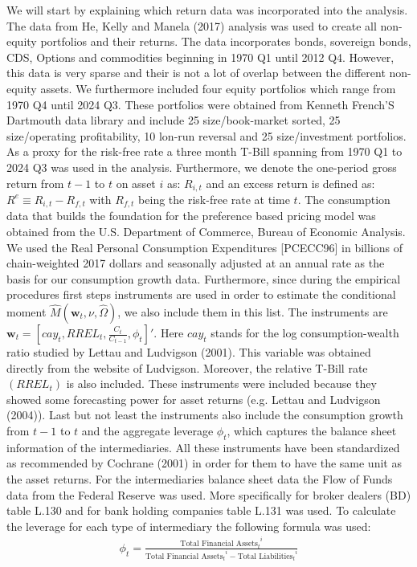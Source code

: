 \documentclass[12pt,a4paper]{article}
\begin{document}
	We will start by explaining which return data was incorporated into the analysis. The data from He, Kelly and Manela (2017) analysis was used to create all non-equity portfolios and their returns. The data incorporates bonds, sovereign bonds, CDS, Options and commodities beginning in 1970 Q1 until 2012 Q4. However, this data is very sparse and their is not a lot of overlap between the different non-equity assets. We furthermore included four equity portfolios which range from 1970 Q4 until 2024 Q3. These portfolios were obtained from Kenneth French'S Dartmouth data library and include 25 size/book-market sorted, 25 size/operating profitability, 10 lon-run reversal and 25 size/investment portfolios. As a proxy for the risk-free rate a three month T-Bill spanning from 1970 Q1 to 2024 Q3 was used in the analysis. Furthermore, we denote the one-period gross return from $t-1$ to $t$ on asset $i$ as: $R_{i, t}$ and an excess return is defined as: $R^{e} \equiv R_{i,t} - R_{f, t}$ with $R_{f,t}$ being the risk-free rate at time $t$.
	The consumption data that builds the foundation for the preference based pricing model was obtained from the U.S. Department of Commerce, Bureau of Economic Analysis. We used the Real Personal Consumption Expenditures [PCECC96] in billions of chain-weighted 2017 dollars and seasonally adjusted at an annual rate as the basis for our consumption growth data. 
	Furthermore, since during the empirical procedures first steps instruments are used in order to estimate the conditional moment $\hat{M}(\textbf{w}_t, \nu, \hat{\Omega})$, we also include them in this list. The instruments are $\textbf{w}_t = \left[ cay_t, RREL_t, \frac{C_t}{C_{t-1}}, \phi_t \right]'$. Here $cay_t$ stands for the log consumption-wealth ratio studied by Lettau and Ludvigson (2001). This variable was obtained directly from the website of Ludvigson. Moreover, the relative T-Bill rate $(RREL_t)$ is also included. These instruments were included because they showed some forecasting power for asset returns (e.g. Lettau and Ludvigson (2004)). Last but not least the instruments also include the consumption growth from $t-1$ to $t$ and the aggregate leverage $\phi_{t}$, which captures the balance sheet information of the intermediaries. All these instruments have been standardized as recommended by Cochrane (2001) in order for them to have the same unit as the asset returns.	
	For the intermediaries balance sheet data the Flow of Funds data from the Federal Reserve was used. More specifically for broker dealers (BD) table L.130 and for bank holding companies table L.131 was used. To calculate the leverage for each type of intermediary the following formula was used:
	\begin{align}
		\phi_{t} = \frac{{\text{Total Financial Assets}_t}^i }{{\text{Total Financial Assets}_t}^i - {\text{Total Liabilities}_t}^i}
	\end{align}
	
\end{document}
